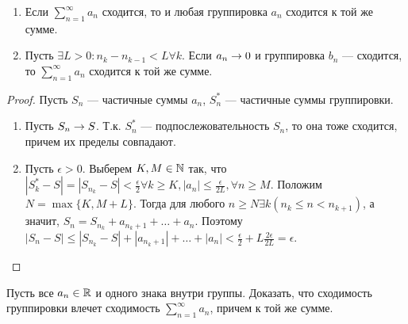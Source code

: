 \begin{lemma}
    \begin{enumerate}
        \item Если \(\sum_{n = 1}^\infty a_n\) сходится, то и любая группировка \(a_n\) сходится к той же сумме.
        \item Пусть \(\exists L > 0: n_{k} - n_{k - 1} < L \forall k\). Если \(a_n \rightarrow 0\) и группировка \(b_n\) --- сходится, то \(\sum_{n = 1}^\infty a_n\) сходится к той же сумме.
    \end{enumerate}
\end{lemma}
\begin{proof}
    Пусть \(S_n\) --- частичные суммы \(a_n\), \(S^*_n\) --- частичные суммы группировки.
    \begin{enumerate}
        \item Пусть \(S_n \rightarrow S\). Т.к. \(S_n^*\) --- подпослежовательность \(S_n\), то она тоже сходится, причем их пределы совпадают.
        \item Пусть \(\epsilon > 0\). Выберем \(K, M \in \mathbb{N}\) так, что \(|S_k^* - S| = |S_{n_k} - S| < \frac{\epsilon}{2} \forall k \ge K, |a_n| \le \frac{\epsilon}{2L}, \forall n \ge M\). Положим \(N = \max\{K, M + L\}\). Тогда для любого \(n \ge N \exists k (n_k \le n < n_{k + 1})\), а значит, \(S_n = S_{n_k} + a_{n_k + 1} + \dots + a_n\). Поэтому \(|S_n - S| \le |S_{n_k} - S| + |a_{n_k + 1}| + \dots + |a_{n}| < \frac{\epsilon}{2} + L\frac{2\epsilon}{2L} = \epsilon\).
    \end{enumerate} 
\end{proof}

\begin{problem}
    Пусть все \(a_n \in \mathbb{R}\) и одного знака внутри группы. Доказать, что сходимость группировки влечет сходимость \(\sum_{n = 1}^\infty a_n\), причем к той же сумме.
\end{problem}

